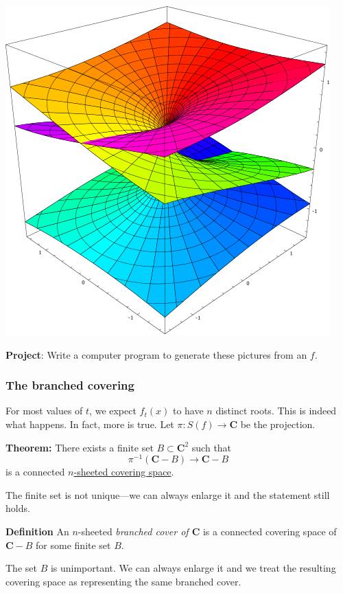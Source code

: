 \documentclass[11pt]{article}
\begin{document}
\begin{center}
\includegraphics[width=.9\linewidth]{assets/Course_notes/2023-03-24_14-34-56_473px-Riemann_surface_cube_root.svg.png}
\end{center}

\textbf{\textbf{Project}}: Write a computer program to generate these pictures from an \(f\).
\subsubsection{The branched covering}
\label{sec:orgb89bf4b}

For most values of \(t\), we expect \(f_t(x)\) to have \(n\) distinct roots.
This is indeed what happens.
In fact, more is true.
Let \(\pi \colon S(f) \to \mathbf{C}\) be the projection.

\textbf{\textbf{Theorem:}} There exists a finite set \(B \subset \mathbf{C}^2\) such that 
\[ \pi^{-1}(\mathbf{C} -B) \to \mathbf{C}-B\]
is a connected \href{https://en.wikipedia.org/wiki/Covering\_space}{\(n\)-sheeted covering space}.

The finite set is not unique---we can always enlarge it and the statement still holds.

\textbf{\textbf{Definition}} An \(n\)-sheeted \emph{branched cover of \(\mathbf{C}\)} is a connected covering space of \(\mathbf{C} - B\) for some finite set \(B\).

The set \(B\) is unimportant.
We can always enlarge it and we treat the resulting covering space as representing the same branched cover.
\end{document}
